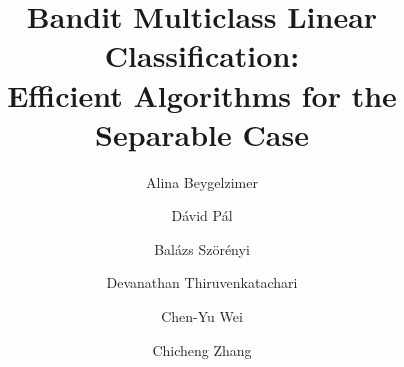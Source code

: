 

\title{Bandit Multiclass Linear Classification: \\ Efficient Algorithms for the Separable Case}

\author[1]{Alina Beygelzimer}
\author[1]{D\'avid P\'al}
\author[1]{Bal\'azs Sz\"or\'enyi}
\author[2]{Devanathan Thiruvenkatachari}
\author[3]{Chen-Yu Wei}
\author[4]{Chicheng Zhang}



\maketitle




